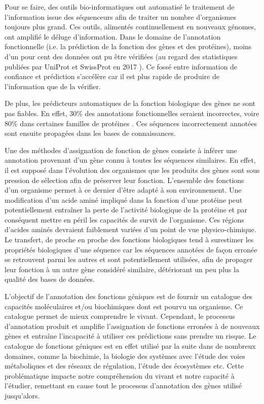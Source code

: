 \begin{refsegment}
Pour se faire, des outils bio-informatiques ont automatisé le traitement de l'information issue des séquenceurs afin de traiter un nombre d'organismes toujours plus grand. Ces outils, alimentés continuellement en nouveaux génomes, ont amplifié le déluge d'information. Dans le domaine de l'annotation fonctionnelle (i.e. la prédiction de la fonction des gènes et des protéines), moins d'un pour cent des données ont pu être vérifiées (au regard des statistiques publiées par UniProt et SwissProt en 2017 \parencites{uniprot_stat}{expasy_stat} ). Ce fossé entre information de confiance et prédiction s'accélère car il est plus rapide de produire de l'information que de la vérifier.

De plus, les prédicteurs automatiques de la fonction biologique des gènes ne sont pas fiables. En effet, 30\% des annotations fonctionnelles seraient incorrectes, voire 80\% dans certaines familles de protéines \parencites{devos2001intrinsic}{schnoes2009annotation}. Ces séquences incorrectement annotées sont ensuite propagées dans les bases de connaissances.

Une des méthodes d'assignation de fonction de gènes consiste à inférer une annotation provenant d'un gène connu à toutes les séquences similaires. En effet, il est supposé dans l’évolution des organismes que les produits des gènes sont sous pression de sélection afin de préserver leur fonction. L'ensemble des fonctions d'un organisme permet à ce dernier d'être adapté à son environnement. Une modification d'un acide aminé impliqué dans la fonction d’une protéine peut potentiellement entraîner la perte de l'activité biologique de la protéine et par conséquent mettre en péril les capacités de survit de l'organisme. Ces régions d'acides aminés devraient faiblement variées d'un point de vue physico-chimique. Le transfert, de proche en proche des fonctions biologiques tend à surestimer les propriétés biologiques d'une séquence car les séquences annotées de façon erronée se retrouvent parmi les autres et sont potentiellement utilisées, afin de propager leur fonction à un autre gène considéré similaire, détériorant un peu plus la qualité des bases de données.

L'objectif de l'annotation des fonctions géniques est de fournir un catalogue des capacités moléculaires et/ou biochimiques dont est pourvu un organisme. Ce catalogue permet de mieux comprendre le vivant. Cependant, le processus d'annotation produit et amplifie l'assignation de fonctions erronées à de nouveaux gènes et entraîne l'incapacité à utiliser ces prédictions sans prendre un risque. Le catalogue de fonctions géniques est en effet utilisé par la suite dans de nombreux domaines, comme la biochimie, la biologie des systèmes avec l’étude des voies métaboliques et des réseaux de régulation, l'étude des écosystèmes etc. Cette problématique impacte notre compréhension du vivant et notre capacité à l'étudier, remettant en cause tout le processus d'annotation des gènes utilisé jusqu'alors.


\end{refsegment}
